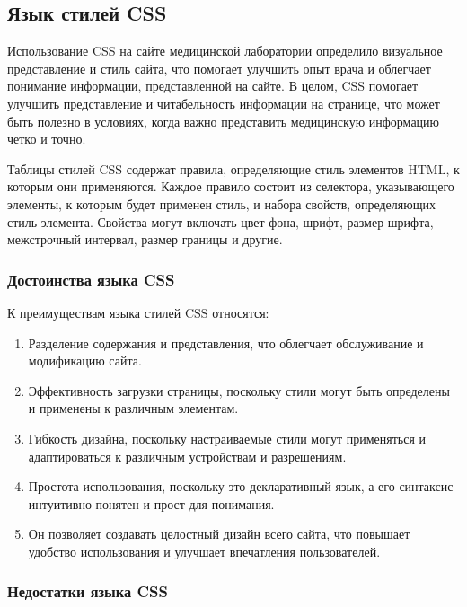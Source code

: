 \subsection{Язык стилей CSS}

Использование CSS на сайте медицинской лаборатории определило визуальное представление и стиль сайта, что помогает улучшить опыт врача и облегчает понимание информации, представленной на сайте. В целом, CSS помогает улучшить представление и читабельность информации на странице, что может быть полезно в условиях, когда важно представить медицинскую информацию четко и точно.

Таблицы стилей CSS содержат правила, определяющие стиль элементов HTML, к которым они применяются\cite{css1}. Каждое правило состоит из селектора, указывающего элементы, к которым будет применен стиль, и набора свойств, определяющих стиль элемента. Свойства могут включать цвет фона, шрифт, размер шрифта, межстрочный интервал, размер границы и другие.

\subsubsection{Достоинства языка CSS}

К преимуществам языка стилей CSS относятся:

\begin{enumerate}
	\item Разделение содержания и представления, что облегчает обслуживание и модификацию сайта.
	\item Эффективность загрузки страницы, поскольку стили могут быть определены и применены к различным элементам.
	\item Гибкость дизайна, поскольку настраиваемые стили могут применяться и адаптироваться к различным устройствам и разрешениям.
	\item Простота использования, поскольку это декларативный язык, а его синтаксис интуитивно понятен и прост для понимания.
	\item Он позволяет создавать целостный дизайн всего сайта, что повышает удобство использования и улучшает впечатления пользователей.
\end{enumerate}

\subsubsection{Недостатки языка CSS}

